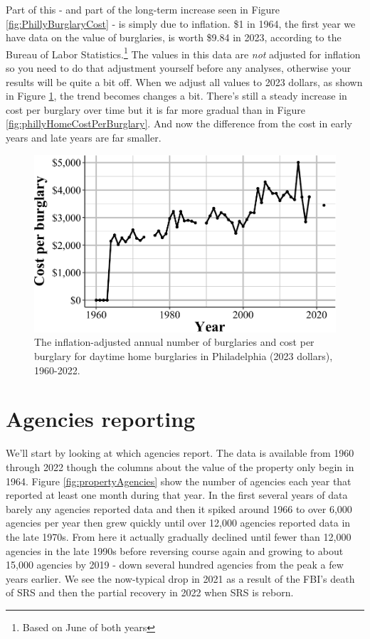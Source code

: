 \documentclass[
  12pt,
  openany]{book}
\begin{document}
Part of this - and part of the long-term increase seen in Figure \ref{fig:PhillyBurglaryCost} - is simply due to inflation. \$1 in 1964, the first year we have data on the value of burglaries, is worth \$9.84 in 2023, according to the Bureau of Labor Statistics.\footnote{Based on June of both years} The values in this data are \emph{not} adjusted for inflation so you need to do that adjustment yourself before any analyses, otherwise your results will be quite a bit off. When we adjust all values to 2023 dollars, as shown in Figure \ref{fig:phillyHomeCostPerBurglaryInflation}, the trend becomes changes a bit. There's still a steady increase in cost per burglary over time but it is far more gradual than in Figure \ref{fig:phillyHomeCostPerBurglary}. And now the difference from the cost in early years and late years are far smaller.

\begin{figure}

{\centering \includegraphics[width=0.9\linewidth]{04_stolen_property_files/figure-latex/phillyHomeCostPerBurglaryInflation-1} 

}

\caption{The inflation-adjusted annual number of burglaries and cost per burglary for daytime home burglaries in Philadelphia (2023 dollars), 1960-2022.}\label{fig:phillyHomeCostPerBurglaryInflation}
\end{figure}

\section{Agencies reporting}\label{agencies-reporting}

We'll start by looking at which agencies report. The data is available from 1960 through 2022 though the columns about the value of the property only begin in 1964. Figure \ref{fig:propertyAgencies} show the number of agencies each year that reported at least one month during that year. In the first several years of data barely any agencies reported data and then it spiked around 1966 to over 6,000 agencies per year then grew quickly until over 12,000 agencies reported data in the late 1970s. From here it actually gradually declined until fewer than 12,000 agencies in the late 1990s before reversing course again and growing to about 15,000 agencies by 2019 - down several hundred agencies from the peak a few years earlier. We see the now-typical drop in 2021 as a result of the FBI's death of SRS and then the partial recovery in 2022 when SRS is reborn.
\end{document}
